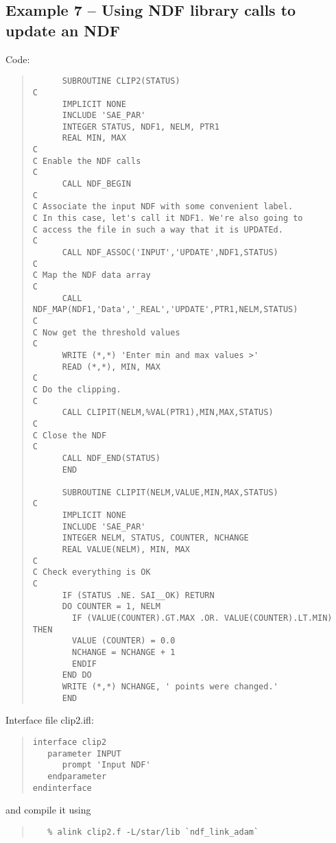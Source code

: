\subsection{Example 7 -- Using NDF library calls to update an NDF}

Code:

\begin{quote}
{\small
\begin{verbatim}
      SUBROUTINE CLIP2(STATUS)
C
      IMPLICIT NONE
      INCLUDE 'SAE_PAR'
      INTEGER STATUS, NDF1, NELM, PTR1
      REAL MIN, MAX
C
C Enable the NDF calls
C
      CALL NDF_BEGIN
C
C Associate the input NDF with some convenient label.
C In this case, let's call it NDF1. We're also going to 
C access the file in such a way that it is UPDATEd.
C
      CALL NDF_ASSOC('INPUT','UPDATE',NDF1,STATUS)
C
C Map the NDF data array
C
      CALL NDF_MAP(NDF1,'Data','_REAL','UPDATE',PTR1,NELM,STATUS)
C
C Now get the threshold values
C
      WRITE (*,*) 'Enter min and max values >'
      READ (*,*), MIN, MAX
C
C Do the clipping.
C
      CALL CLIPIT(NELM,%VAL(PTR1),MIN,MAX,STATUS)
C
C Close the NDF 
C
      CALL NDF_END(STATUS)
      END

      SUBROUTINE CLIPIT(NELM,VALUE,MIN,MAX,STATUS)
C
      IMPLICIT NONE
      INCLUDE 'SAE_PAR'
      INTEGER NELM, STATUS, COUNTER, NCHANGE
      REAL VALUE(NELM), MIN, MAX
C
C Check everything is OK
C
      IF (STATUS .NE. SAI__OK) RETURN
      DO COUNTER = 1, NELM
        IF (VALUE(COUNTER).GT.MAX .OR. VALUE(COUNTER).LT.MIN) THEN
        VALUE (COUNTER) = 0.0
        NCHANGE = NCHANGE + 1
        ENDIF
      END DO
      WRITE (*,*) NCHANGE, ' points were changed.'
      END
\end{verbatim}
}
\end{quote}

Interface file {\sf clip2.ifl}:

\begin{quote}
{\small
\begin{verbatim}
interface clip2
   parameter INPUT
      prompt 'Input NDF'
   endparameter
endinterface
\end{verbatim}
}
\end{quote}

and compile it using 

\begin{quote}
{\small
\begin{verbatim}
   % alink clip2.f -L/star/lib `ndf_link_adam`
\end{verbatim}
}
\end{quote}

